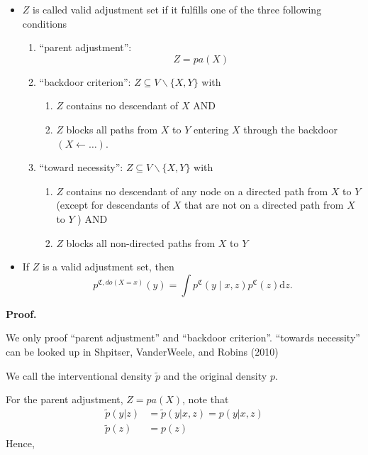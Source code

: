 \documentclass[a4paper,10pt,openany]{book}
\providecommand{\tightlist}{%
 \setlength{\itemsep}{0pt}\setlength{\parskip}{0pt}}
\begin{document}
\begin{itemize}
\item
  \(Z\) is called valid adjustment set if it fulfills one of the three following conditions

  \begin{enumerate}
  \def\labelenumi{\arabic{enumi}.}
  \tightlist
  \item
    ``parent adjustment'':
    \[
      {Z}=pa(X)
      \]
  \item
    ``backdoor criterion'': \({Z} \subseteq {V} \backslash\{X, Y\}\) with

    \begin{enumerate}
    \def\labelenumii{(\roman{enumii})}
    \tightlist
    \item
      \({Z}\) contains no descendant of \(X\) AND
    \item
      \({Z}\) blocks all paths from \(X\) to \(Y\) entering \(X\) through the backdoor \((X \leftarrow \ldots)\).
    \end{enumerate}
  \item
    ``toward necessity'': \({Z} \subseteq {V} \backslash\{X, Y\}\) with

    \begin{enumerate}
    \def\labelenumii{(\roman{enumii})}
    \tightlist
    \item
      \({Z}\) contains no descendant of any node on a directed path from \(X\) to \(Y\) (except for descendants of \(X\) that are not on a directed path from \(X\) to \(Y\) ) AND
    \item
      \({Z}\) blocks all non-directed paths from \(X\) to \(Y\)
    \end{enumerate}
  \end{enumerate}
\item
  If \(Z\) is a valid adjustment set, then
  \[
    p^{\mathfrak{C}, d o(X=x)}(y)=\int  p^{\mathfrak{C}}(y \mid x, {z}) p^{\mathfrak{C}}({z}) \mathrm dz.
    \]
\end{itemize}

\textbf{Proof.}

We only proof ``parent adjustment'' and ``backdoor criterion''. ``towards necessity'' can be looked up in Shpitser, VanderWeele, and Robins (2010)

We call the interventional density \(\tilde p\) and the original density \(p\).

For the parent adjustment, \(Z=pa(X)\), note that\\
\begin{align}
\tilde p (y|z)&= \tilde p (y|x,z)= p (y|x,z) \\
\tilde p(z)&= p(z)
\end{align}
Hence,
\end{document}
